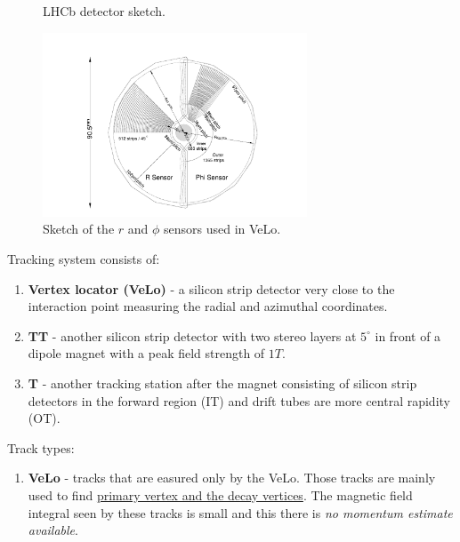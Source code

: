 \documentclass[11pt,a4paper,twoside]{article}
\begin{document}
\begin{enumerate}
\begin{figure}[H]
            \caption{LHCb detector sketch.}
            \label{fig:001-LHCb_detector}
        \end{figure}

        \begin{figure}[H]
            \centering

            \includegraphics[width=0.7\textwidth]{visuals/006-sensors-in-VeLo.png}
            
            \caption{Sketch of the $r$ and $\phi$ sensors used in VeLo.}
            \label{fig:001-LHCb_detector}
        \end{figure}



        Tracking system consists of:
        \begin{enumerate}
            \item \textbf{Vertex locator (VeLo)} - a silicon strip detector very close to the interaction point measuring the radial and azimuthal coordinates.

            \item \textbf{TT} - another silicon strip detector with two stereo layers at $5^\circ$  in front of a dipole magnet with a peak field strength of $1 T$.

            \item \textbf{T} - another tracking station after the magnet consisting of silicon strip detectors in the forward region (IT) and drift tubes are more central rapidity (OT).
        \end{enumerate}

        Track types:
        \begin{enumerate}
            \item \textbf{VeLo} - tracks that are easured only by the VeLo. Those tracks are mainly used to find \underline{primary vertex and the decay vertices}. The magnetic field integral seen by these tracks is small and this there is \textit{no momentum estimate available}.
            

\end{enumerate}
\end{enumerate}
\end{document}
